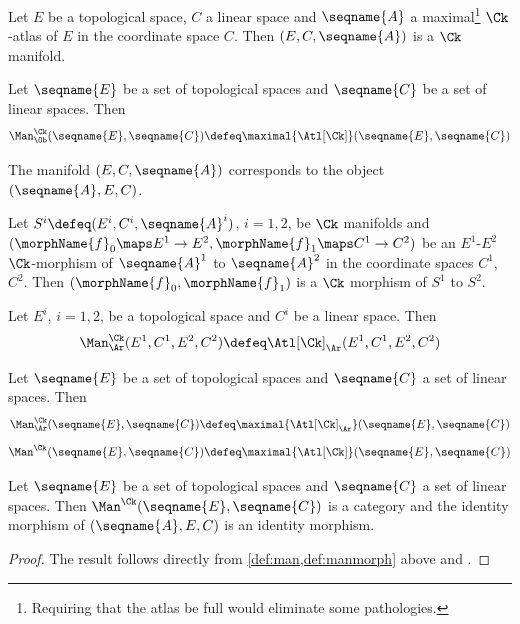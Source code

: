 \documentclass{article}
\begin{document}
\begin{definition}
\label{def:man}
Let $E$ be a topological space, $C$ a linear space and $\seqname{A}$ a
maximal\footnote{
Requiring that the atlas be full would eliminate some pathologies.}
$\Ck$-atlas of $E$ in the coordinate space $C$. Then $(E, C,
\seqname{A})$ is a $\Ck$ manifold.

Let $\seqname{E}$ be a set of topological spaces and $\seqname{C}$ be a
set of linear spaces. Then
\begin{equation}
\Man^\Ck_\Ob(\seqname{E}, \seqname{C}) \defeq
\maximal{\Atl[\Ck]}(\seqname{E}, \seqname{C})
\end{equation}
\begin{remark}
The manifold $(E, C, \seqname{A})$ corresponds to the object
$(\seqname{A}, E, C)$.
\end{remark}
\end{definition}

\begin{definition}
\label{def:manmorph}
Let $S^i \defeq (E^i,C^i,\seqname{A}^i)$, $i=1,2$, be $\Ck$ manifolds
and $(\morphName{f}_0 \maps E^1 \to E^2, \morphName{f}_1 \maps C^1 \to C^2)$
be an $E^1$-$E^2$ $\Ck$-morphism of $\seqname{A}^1$ to $\seqname{A}^2$
in the coordinate spaces $C^1$, $C^2$. Then
$(\morphName{f}_0, \morphName{f}_1)$ is a $\Ck$ morphism of $S^1$ to
$S^2$.

Let $E^i$, $i=1,2$, be a topological space and $C^i$ be a linear space.
Then
\begin{multline}
\Man^\Ck_\Ar(E^1, C^1, E^2, C^2) \defeq
\Atl[\Ck]_\Ar(E^1, C^1, E^2, C^2)
\end{multline}

Let $\seqname{E}$ be a set of topological spaces and $\seqname{C}$ a
set of linear spaces. Then
\begin{equation}
\Man^\Ck_\Ar(\seqname{E}, \seqname{C}) \defeq
\maximal{\Atl[\Ck]_\Ar}(\seqname{E}, \seqname{C})
\end{equation}
\begin{equation}
\Man^\Ck(\seqname{E}, \seqname{C}) \defeq
\maximal{\Atl[\Ck]}(\seqname{E}, \seqname{C})
\end{equation}
\end{definition}

\begin{theorem}
Let $\seqname{E}$ be a set of topological spaces and $\seqname{C}$ a set
of linear spaces. Then $\Man^\Ck(\seqname{E}, \seqname{C})$ is a
category and the identity morphism of $(\seqname{A}, E, C)$ is an
identity morphism.

\begin{proof}
{
  \showlabelsinline
  The result follows directly from \cref{def:man,def:manmorph} above and
}
.
\end{proof}
\end{theorem}
\end{document}
